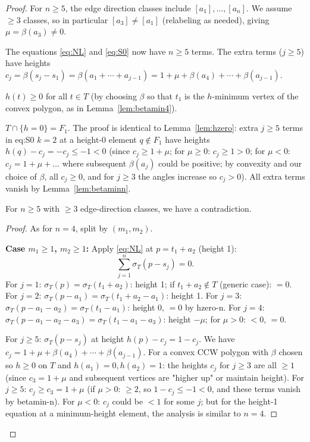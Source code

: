 \begin{proof}
For $n\geq 5$, the edge direction classes include $[a_1],\ldots,[a_n]$. We assume $\geq 3$ classes, so in particular $[a_3]\neq[a_1]$ (relabeling as needed), giving $\mu = \beta(a_3)\neq 0$.

The equations \eqref{eq:NL} and \eqref{eq:S0} now have $n\geq 5$ terms. The extra terms ($j\geq 5$) have heights $c_j = \beta(s_j-s_1) = \beta(a_1+\cdots+a_{j-1})=1+\mu+\beta(a_4)+\cdots+\beta(a_{j-1})$.

\begin{lemma}[betamin-n]\label{lem:betaminn}
$h(t)\geq 0$ for all $t\in T$ (by choosing $\beta$ so that $t_1$ is the $h$-minimum vertex of the convex polygon, as in Lemma~\ref{lem:betamin4}).
\end{lemma}

\begin{lemma}[hzero-n]\label{lem:hzeron}
$T\cap\{h=0\}=F_1$. The proof is identical to Lemma~\ref{lem:hzero}: extra $j\geq 5$ terms in eq:S0 $k=2$ at a height-0 element $q\notin F_1$ have heights $h(q)-c_j = -c_j\leq -1<0$ (since $c_j\geq 1+\mu$; for $\mu\geq 0$: $c_j\geq 1>0$; for $\mu<0$: $c_j=1+\mu+\ldots$ where subsequent $\beta(a_j)$ could be positive; by convexity and our choice of $\beta$, all $c_j\geq 0$, and for $j\geq 3$ the angles increase so $c_j>0$). All extra terms vanish by Lemma~\ref{lem:betaminn}.
\end{lemma}

\begin{proposition}\label{prop:n5}
For $n\geq 5$ with $\geq 3$ edge-direction classes, we have a contradiction.
\end{proposition}
\begin{proof}
As for $n=4$, split by $(m_1,m_2)$.

\textbf{Case $m_1\geq 1$, $m_2\geq 1$:} Apply \eqref{eq:NL} at $p=t_1+a_2$ (height 1):
\[
  \sum_{j=1}^n \sigma_T(p-s_j)=0.
\]
For $j=1$: $\sigma_T(p)=\sigma_T(t_1+a_2)$: height 1; if $t_1+a_2\notin T$ (generic case): $=0$. For $j=2$: $\sigma_T(p-a_1)=\sigma_T(t_1+a_2-a_1)$: height 1. For $j=3$: $\sigma_T(p-a_1-a_2)=\sigma_T(t_1-a_1)$: height 0, $=0$ by hzero-n. For $j=4$: $\sigma_T(p-a_1-a_2-a_3)=\sigma_T(t_1-a_1-a_3)$: height $-\mu$; for $\mu>0$: $<0$, $=0$.

For $j\geq 5$: $\sigma_T(p-s_j)$ at height $h(p)-c_j = 1-c_j$. We have $c_j = 1+\mu+\beta(a_4)+\cdots+\beta(a_{j-1})$. For a convex CCW polygon with $\beta$ chosen so $h\geq 0$ on $T$ and $h(a_1)=0, h(a_2)=1$: the heights $c_j$ for $j\geq 3$ are all $\geq 1$ (since $c_3=1+\mu$ and subsequent vertices are "higher up" or maintain height). For $j\geq 5$: $c_j \geq c_3 = 1+\mu$ (if $\mu>0$: $\geq 2$, so $1-c_j\leq -1<0$, and these terms vanish by betamin-n). For $\mu<0$: $c_j$ could be $<1$ for some $j$; but for the height-1 equation at a minimum-height element, the analysis is similar to $n=4$.


\end{proof}
\end{proof}
